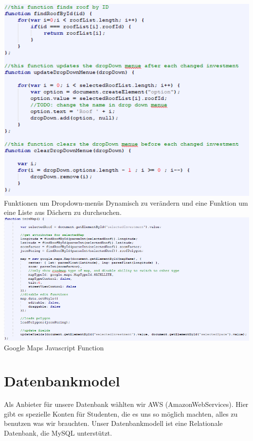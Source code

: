 \documentclass[12pt,a4paper]{article}
\begin{document}
\hspace{-5em} \includegraphics[width=1.2\textwidth]{./Graphics/bild6}\\


\noindent Funktionen um Dropdown-menüs Dynamisch zu verändern und eine Funktion um eine Liste aus Dächern zu durchsuchen. \\


\hspace{-5em} \includegraphics[width=1.2\textwidth]{./Graphics/bild7}\\

Google Maps Javascript Function






\section{Datenbankmodel}
Als Anbieter für unsere Datenbank wählten wir AWS (AmazonWebServices). Hier gibt es spezielle Konten für Studenten, die es uns so möglich machten, alles zu benutzen was wir brauchten. Unser Datenbankmodell ist eine Relationale Datenbank, die MySQL unterstützt.
\end{document}
